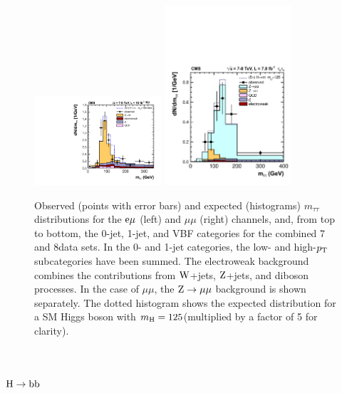 \documentclass[12pt,twoside,a4paper,cmspaper,final,collab]{cms-tdr}
\begin{document}
\begin{figure}[htbp]
\begin{center}
\includegraphics[width=0.42\textwidth]{figures/htt/emu_vbf_rescaled_7and8TeV.pdf}
\includegraphics[width=0.42\textwidth]{figures/htt/mumu_rescaled_vbf.pdf}
\end{center}
\caption{Observed (points with error bars) and expected (histograms) $m_{\tau\tau}$ distributions for the $\mathrm{e}\mu$ (left) and $\mu\mu$ (right) channels, and,
from top to bottom, the 0-jet, 1-jet, and VBF categories for the combined 7  and 8\TeV data sets.
In the 0- and 1-jet categories, the low- and high-$p_{\mathrm{T}}$ subcategories have been summed.
The electroweak background combines the contributions from $\mathrm{W}$+jets, $\mathrm{Z}$+jets, and diboson processes.
In the case of $\mu\mu$, the $\mathrm{Z}\to\mu\mu$ background is shown separately.
The dotted histogram shows the expected distribution for a SM Higgs boson with $m_{\mathrm{H}}=125$\GeV (multiplied by a factor of 5 for clarity).
}
\label{fig:htt_mtt_leplep}
\end{figure}

\section{\texorpdfstring{$\mathrm{H}\to\mathrm{b}\mathrm{b}$}{H to bb}\label{sec:hbb}}
\end{document}
